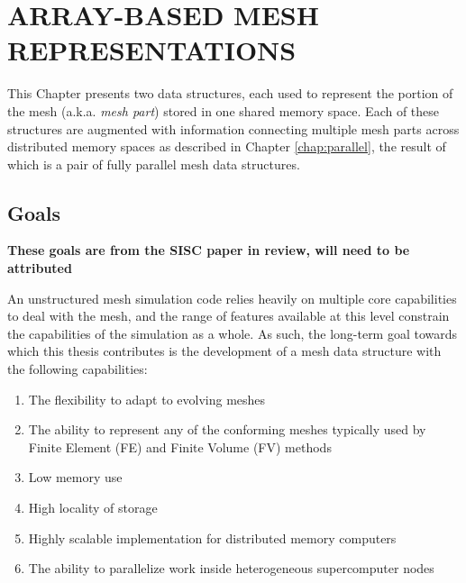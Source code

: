 
\chapter{ARRAY-BASED MESH REPRESENTATIONS}
\label{chap:struct}

This Chapter presents two data structures, each used to represent
the portion of the mesh (a.k.a. \emph{mesh part}) stored in one
shared memory space.
Each of these structures are augmented with information connecting multiple
mesh parts across distributed memory spaces as described in
Chapter \ref{chap:parallel}, the result of which is a pair of fully parallel
mesh data structures.

\section{Goals}
\label{sec:struct_goals}

{\bf These goals are from the SISC paper in review, will
need to be attributed}

An unstructured mesh simulation code relies heavily on
multiple core capabilities to deal with the mesh,
and the range of features available at this level constrain
the capabilities of the simulation as a whole.
As such, the long-term goal towards which this thesis
contributes is the development of a mesh data structure
with the following capabilities:

\begin{enumerate}
\item The flexibility to adapt to evolving meshes
\item The ability to represent any of the conforming meshes typically
used by Finite Element (FE) and Finite Volume (FV) methods
\item Low memory use
\item High locality of storage
\item Highly scalable implementation for distributed memory computers
\item The ability to parallelize work inside heterogeneous
supercomputer nodes
\end{enumerate}


